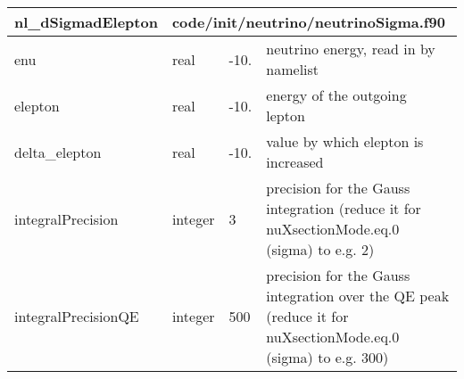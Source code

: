 \documentclass{article}
\begin{document}

\begin{longtable}{llll}
\toprule
\textbf{\large{nl\_dSigmadElepton}} & \multicolumn{3}{l}{\footnotesize{code/init/neutrino/neutrinoSigma.f90}}\\*
\midrule
\endfirsthead
\midrule
\endhead
enu & \begin{minipage}[t]{2cm}real\end{minipage} & \begin{minipage}[t]{2cm}-10.\end{minipage} & \begin{minipage}[t]{12cm}neutrino energy, read in by namelist\end{minipage}\\*
\midrule
elepton & \begin{minipage}[t]{2cm}real\end{minipage} & \begin{minipage}[t]{2cm}-10.\end{minipage} & \begin{minipage}[t]{12cm}energy of the outgoing lepton\end{minipage}\\*
\midrule
delta\_elepton & \begin{minipage}[t]{2cm}real\end{minipage} & \begin{minipage}[t]{2cm}-10.\end{minipage} & \begin{minipage}[t]{12cm}value by which elepton is increased\end{minipage}\\*
\midrule
integralPrecision & \begin{minipage}[t]{2cm}integer\end{minipage} & \begin{minipage}[t]{2cm}3\end{minipage} & \begin{minipage}[t]{12cm}precision for the Gauss integration (reduce it for nuXsectionMode.eq.0 (sigma) to e.g. 2)\end{minipage}\\*
\midrule
integralPrecisionQE & \begin{minipage}[t]{2cm}integer\end{minipage} & \begin{minipage}[t]{2cm}500\end{minipage} & \begin{minipage}[t]{12cm}precision for the Gauss integration over the QE peak (reduce it for nuXsectionMode.eq.0 (sigma) to e.g. 300)\end{minipage}\\*
\bottomrule
\end{longtable}
{ }
\end{document}
